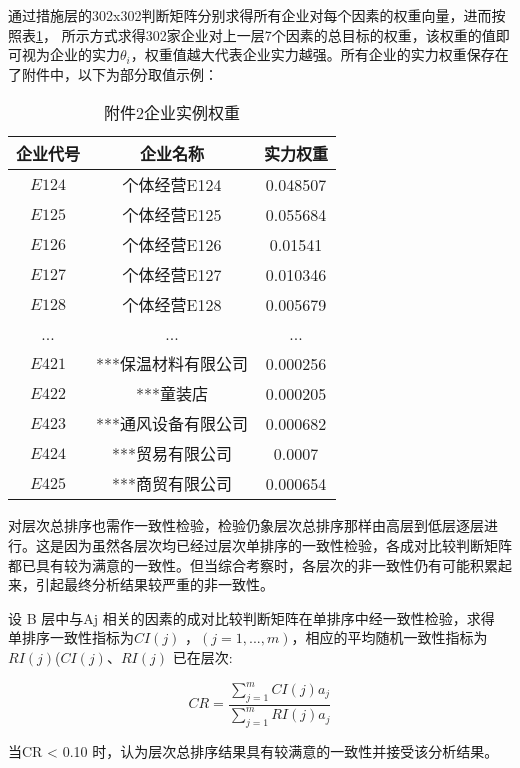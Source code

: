 \documentclass{cumcmthesis}
\begin{document}
通过措施层的302x302判断矩阵分别求得所有企业对每个因素的权重向量，进而按照表\ref{tablecenci}，
所示方式求得302家企业对上一层7个因素的总目标的权重，该权重的值即可视为企业的实力$\theta_i$，权重值越大代表企业实力越强。所有企业的实力权重保存在了附件中，以下为部分取值示例：

\begin{table}[H]
    \begin{center}
    \begin{tabular}{|c|c|c|}
        \hline
    企业代号 & 企业名称 & 实力权重\\
    \hline
    $E124$ & 个体经营E124 & 0.048507\\
    $E125$ & 个体经营E125 & 0.055684\\
    $E126$ & 个体经营E126 & 0.01541\\
    $E127$ & 个体经营E127 & 0.010346\\
    $E128$ & 个体经营E128 & 0.005679\\
    ... & ... & ...\\
    $E421$ & ***保温材料有限公司 & 0.000256\\
    $E422$ & ***童装店          & 0.000205\\
    $E423$ & ***通风设备有限公司 & 0.000682\\
    $E424$ & ***贸易有限公司 & 0.0007\\
    $E425$ & ***商贸有限公司 & 0.000654\\
    \hline
    \end{tabular}
    \end{center}
    \caption{附件2企业实例权重}
    \label{tablecenci}
    \end{table}

对层次总排序也需作一致性检验，检验仍象层次总排序那样由高层到低层逐层进行。这是因为虽然各层次均已经过层次单排序的一致性检验，各成对比较判断矩阵都已具有较为满意的一致性。但当综合考察时，各层次的非一致性仍有可能积累起来，引起最终分析结果较严重的非一致性。

设 B 层中与Aj 相关的因素的成对比较判断矩阵在单排序中经一致性检验，求得
单排序一致性指标为$CI\left(j\right)$ ，$\left(j = 1,...,m\right)$，相应的平均随机一致性指标为 $RI\left(j\right)$($CI\left(j\right)$、$RI\left(j\right)$ 已在层次:


\begin{equation}
    CR = \frac{\sum^{m}_{j=1}CI\left(j\right)a_j}{\sum^{m}_{j=1}RI\left(j\right)a_j}
\end{equation}

当CR < 0.10 时，认为层次总排序结果具有较满意的一致性并接受该分析结果。 
\end{document}
